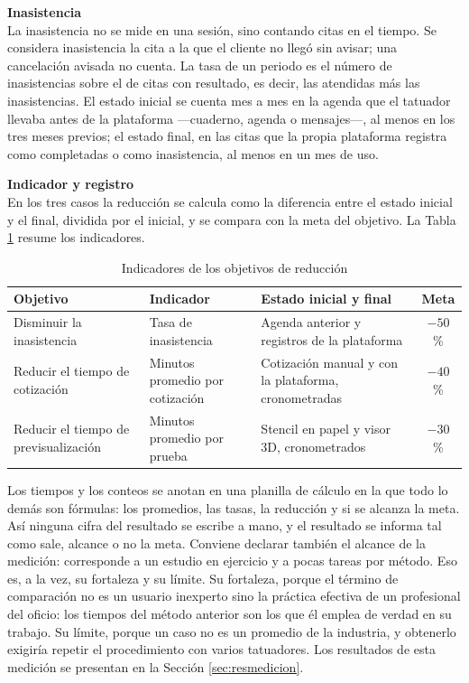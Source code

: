 \documentclass[12pt,letterpaper,oneside]{report}
\newcommand{\tituloparpegado}[1]{\par\textbf{#1}\\\indent\ignorespaces}
\begin{document}
\vspace{\parskip}
\tituloparpegado{Inasistencia}
La inasistencia no se mide en una sesión, sino contando citas en el tiempo. Se considera inasistencia la cita a la que el cliente no llegó sin avisar; una cancelación avisada no cuenta. La tasa de un periodo es el número de inasistencias sobre el de citas con resultado, es decir, las atendidas más las inasistencias. El estado inicial se cuenta mes a mes en la agenda que el tatuador llevaba antes de la plataforma —cuaderno, agenda o mensajes—, al menos en los tres meses previos; el estado final, en las citas que la propia plataforma registra como completadas o como inasistencia, al menos en un mes de uso.

\vspace{\parskip}
\tituloparpegado{Indicador y registro}
En los tres casos la reducción se calcula como la diferencia entre el estado inicial y el final, dividida por el inicial, y se compara con la meta del objetivo. La Tabla \ref{tab:medicion} resume los indicadores.

\begin{table}[H]
  \centering
  \caption{Indicadores de los objetivos de reducción}
  \label{tab:medicion}
  \renewcommand{\arraystretch}{1.3}
  \small
  \begin{tabular}{|>{\raggedright\arraybackslash}p{3.4cm}|>{\raggedright\arraybackslash}p{3.2cm}|>{\raggedright\arraybackslash}p{4.4cm}|c|}
    \hline
    \textbf{Objetivo} & \textbf{Indicador} & \textbf{Estado inicial y final} & \textbf{Meta} \\ \hline
    Disminuir la inasistencia & Tasa de inasistencia & Agenda anterior y registros de la plataforma & $-50$ \% \\ \hline
    Reducir el tiempo de cotización & Minutos promedio por cotización & Cotización manual y con la plataforma, cronometradas & $-40$ \% \\ \hline
    Reducir el tiempo de previsualización & Minutos promedio por prueba & Stencil en papel y visor 3D, cronometrados & $-30$ \% \\ \hline
  \end{tabular}
\end{table}

Los tiempos y los conteos se anotan en una planilla de cálculo en la que todo lo demás son fórmulas: los promedios, las tasas, la reducción y si se alcanza la meta. Así ninguna cifra del resultado se escribe a mano, y el resultado se informa tal como sale, alcance o no la meta. Conviene declarar también el alcance de la medición: corresponde a un estudio en ejercicio y a pocas tareas por método. Eso es, a la vez, su fortaleza y su límite. Su fortaleza, porque el término de comparación no es un usuario inexperto sino la práctica efectiva de un profesional del oficio: los tiempos del método anterior son los que él emplea de verdad en su trabajo. Su límite, porque un caso no es un promedio de la industria, y obtenerlo exigiría repetir el procedimiento con varios tatuadores. Los resultados de esta medición se presentan en la Sección \ref{sec:resmedicion}.
\end{document}
